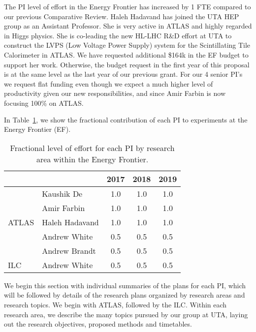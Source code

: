 
The PI level of effort in the Energy Frontier has increased by 1 FTE compared to our previous Comparative Review. Haleh Hadavand has joined the UTA HEP group as an Assistant Professor. She is very active in ATLAS and highly regarded in Higgs physics. She is co-leading the new HL-LHC R\&D effort at UTA to construct the LVPS (Low Voltage Power Supply) system for the Scintillating Tile Calorimeter in ATLAS. We have requested additional \$164k in the EF budget to support her work. Otherwise, the budget request in the first year of this proposal is at the  same level as the last year of our previous grant. For our 4 senior PI's we request flat funding even though we expect a much higher level of productivity given our new responsibilities, and since Amir Farbin is now focusing 100\% on ATLAS.

In Table~\ref{table:ef-fractions}, we show the fractional contribution of each PI to experiments at the Energy Frontier (EF).

\begin{table}[htb]
\centering
\begin{tabular}{ l | l | c | c | c }
\hline \hline
\multicolumn{2}{c|}{} & 2017 & 2018 & 2019 \\ \hline
\multirow{5}{*}{ATLAS} & Kaushik De & 1.0 & 1.0 & 1.0 \\ \cline{2-5}
 & Amir Farbin & 1.0 & 1.0 &1.0 \\ \cline{2-5}
 & Haleh Hadavand & 1.0 & 1.0 & 1.0 \\ \cline{2-5}
 & Andrew White & 0.5 & 0.5 & 0.5 \\ \cline{2-5}
 & Andrew Brandt & 0.5 & 0.5 & 0.5 \\ \hline
ILC & Andrew White & 0.5 & 0.5 & 0.5 \\ \hline  \hline
\end{tabular}
\caption{Fractional level of effort for each PI by research area within the Energy Frontier.}
\label{table:ef-fractions}
\end{table}

We begin this section with individual summaries of the plans for each PI, which will be followed by details of the research plans organized by research areas and research topics. We begin with ATLAS, followed by the ILC. Within each research area, we describe the many topics pursued by our group at UTA, laying out the research objectives, proposed methods and timetables.

